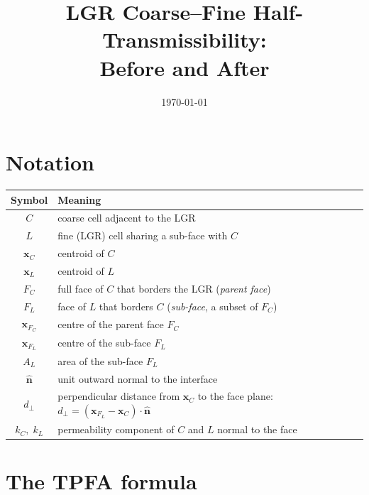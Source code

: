 \documentclass[11pt,a4paper]{article}
\title{LGR Coarse--Fine Half-Transmissibility:\\Before and After}
\author{}
\date{\today}
\begin{document}
\maketitle

\section*{Notation}

\begin{center}
\renewcommand{\arraystretch}{1.3}
\begin{tabular}{cl}
\toprule
Symbol & Meaning \\
\midrule
$C$                  & coarse cell adjacent to the LGR \\
$L$                  & fine (LGR) cell sharing a sub-face with $C$ \\
$\mathbf{x}_C$       & centroid of $C$ \\
$\mathbf{x}_L$       & centroid of $L$ \\
$F_C$                & full face of $C$ that borders the LGR
                       (\emph{parent face}) \\
$F_L$                & face of $L$ that borders $C$
                       (\emph{sub-face}, a subset of $F_C$) \\
$\mathbf{x}_{F_C}$   & centre of the parent face $F_C$ \\
$\mathbf{x}_{F_L}$   & centre of the sub-face $F_L$ \\
$A_L$                & area of the sub-face $F_L$ \\
$\hat{\mathbf{n}}$   & unit outward normal to the interface \\
$d_\perp$            & perpendicular distance from $\mathbf{x}_C$
                       to the face plane:
                       $d_\perp =
                        (\mathbf{x}_{F_L}-\mathbf{x}_C)\cdot\hat{\mathbf{n}}$ \\
$k_C,\;k_L$          & permeability component of $C$ and $L$
                       normal to the face \\
\bottomrule
\end{tabular}
\end{center}

\section*{The TPFA formula}
\end{document}
